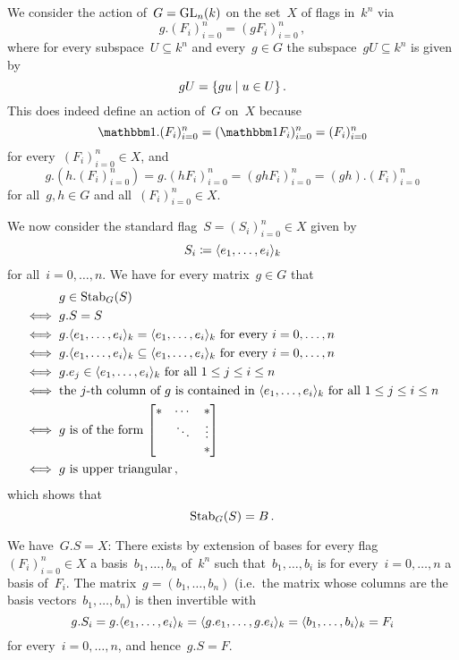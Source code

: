 \subsection{}

We consider the action of~$G = \operatorname{GL}_n(k)$ on the set~$X$ of flags in~$k^n$ via
\[
    g . (F_i)_{i=0}^n
  = ( gF_i )_{i=0}^n \,,
\]
where for every subspace~$U \subseteq k^n$ and every~$g \in G$ the subspace~$gU \subseteq k^n$ is given by
\[
    gU
  = \{ g u \suchthat u \in U \} \,.
\]
This does indeed define an action of~$G$ on~$X$ because
\[
    \Id.(F_i)_{i=0}^n
  = (\Id F_i)_{i=0}^n
  = (F_i)_{i=0}^n
\]
for every~$(F_i)_{i=0}^n \in X$, and
\[
    g.(h.(F_i)_{i=0}^n)
  = g.(h F_i)_{i=0}^n
  = (g h F_i)_{i=0}^n
  = (gh).(F_i)_{i=0}^n
\]
for all~$g, h \in G$ and all~$(F_i)_{i=0}^n \in X$.

We now consider the standard flag~$S = (S_i)_{i=0}^n \in X$ given by
\[
            S_i
  \coloneqq  \langle e_1, \dotsc, e_i\rangle_k
\]
for all~$i = 0, \dotsc, n$.
We have for every matrix~$g \in G$ that
\begingroup
\allowdisplaybreaks
\begin{align*}
      {}& g \in \Stab_G(S) \\
  \iff{}& g.S = S \\
  \iff{}& \text{$g.\gen{e_1, \dotsc, e_i}_k = \gen{e_1, \dotsc, e_i}_k$ for every~$i = 0, \dotsc, n$} \\
  \iff{}& \text{$g.\gen{e_1, \dotsc, e_i}_k \subseteq \gen{e_1, \dotsc, e_i}_k$ for every~$i = 0, \dotsc, n$} \\
  \iff{}& \text{$g.e_j \in \gen{e_1, \dotsc, e_i}_k$ for all~$1 \leq j \leq i \leq n$} \\
  \iff{}& \text{the~\dash{$j$}{th} column of~$g$ is contained in~$\gen{e_1, \dotsc, e_i}_k$ for all~$1 \leq j \leq i \leq n$}  \\
  \iff{}& \text{$g$ is of the form
            $
            \begin{bmatrix}
              * & \cdots  & *       \\
                & \ddots  & \vdots  \\
                &         & *
             \end{bmatrix}
            $
          } \\
  \iff{}& \text{$g$ is upper triangular} \,,
\end{align*}
\endgroup
which shows that
\[
    \operatorname{Stab}_G(S)
  = B \,.
\]

We have~$G.S = X$:
There exists by extension of bases for every flag~$(F_i)_{i=0}^n \in X$ a basis~$b_1, \dotsc, b_n$ of~$k^n$ such that~$b_1, \dotsc, b_i$ is for every~$i = 0, \dotsc, n$ a basis of~$F_i$.
The matrix~$g = (b_1, \dotsc, b_n)$ (i.e.\ the matrix whose columns are the basis vectors~$b_1, \dotsc, b_n$) is then invertible with
\[
    g.S_i
  = g.\langle e_1, \dotsc, e_i\rangle_k
  = \langle g.e_1, \dotsc, g.e_i\rangle_k
  = \langle b_1, \dotsc, b_i\rangle_k
  = F_i
\]
for every~$i = 0, \dotsc, n$, and hence~$g.S = F$.

